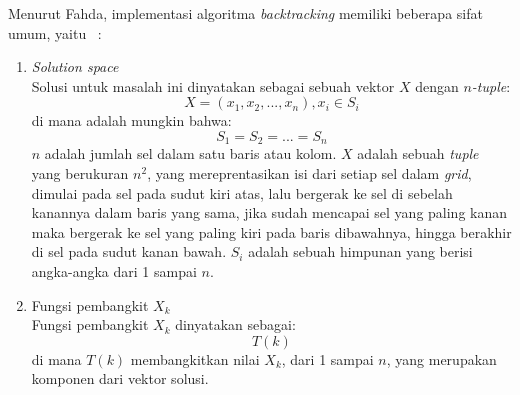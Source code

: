 \documentclass[a4paper,twoside]{article}
\begin{document}
\begin{enumerate}
Menurut Fahda, implementasi algoritma \textit{backtracking} memiliki beberapa sifat umum, yaitu ~\cite{Fahda}:
\begin{enumerate}
\item \textit{Solution space}
\\ Solusi untuk masalah ini dinyatakan sebagai sebuah vektor \begin{math}X\end{math} dengan \textit{\begin{math}n\end{math}-tuple}:
\begin{displaymath}
X = (x_1, x_2, ..., x_n), x_i \in S_i
\end{displaymath}
di mana adalah mungkin bahwa:
\begin{displaymath}
S_1 = S_2 = ... = S_n
\end{displaymath}
\begin{math}n\end{math} adalah jumlah sel dalam satu baris atau kolom. \begin{math}X\end{math} adalah sebuah \textit{tuple} yang berukuran \begin{math}n^2\end{math}, yang mereprentasikan isi dari setiap sel dalam \textit{grid}, dimulai pada sel pada sudut kiri atas, lalu bergerak ke sel di sebelah kanannya dalam baris yang sama, jika sudah mencapai sel yang paling kanan maka bergerak ke sel yang paling kiri pada baris dibawahnya, hingga berakhir di sel pada sudut kanan bawah. \begin{math}S_i\end{math} adalah sebuah himpunan yang berisi angka-angka dari 1 sampai \begin{math}n\end{math}.
\item Fungsi pembangkit \begin{math}X_k\end{math}
\\ Fungsi pembangkit \begin{math}X_k\end{math} dinyatakan sebagai:
\begin{displaymath}
T(k)
\end{displaymath}
di mana \begin{math}T(k)\end{math} membangkitkan nilai \begin{math}X_k\end{math}, dari 1 sampai \begin{math}n\end{math}, yang merupakan komponen dari vektor solusi.

\end{enumerate}
\end{enumerate}
\end{document}
